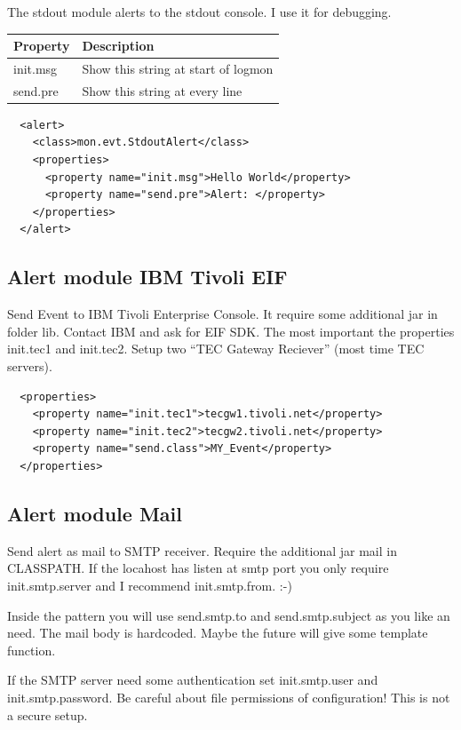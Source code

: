 \documentclass[11pt,a4paper]{article}
\begin{document}
The stdout module alerts to the stdout console. I use it for debugging.

\begin{tabular}{l|p{}}
  Property 	& Description\\\hline
  init.msg 	& Show this string at start of logmon\\
  send.pre 	& Show this string at every line\\
\end{tabular}

\begin{verbatim}
  <alert>
    <class>mon.evt.StdoutAlert</class>
    <properties>
      <property name="init.msg">Hello World</property>
      <property name="send.pre">Alert: </property>
    </properties>
  </alert>
\end{verbatim}

\subsection{Alert module IBM Tivoli EIF}
\label{sec:eif}

Send Event to IBM Tivoli Enterprise Console. It require some additional jar in
folder lib. Contact IBM and ask for EIF SDK. The most important the properties
init.tec1 and init.tec2. Setup two ``TEC Gateway Reciever'' (most time TEC
servers).

\begin{verbatim}
  <properties>
    <property name="init.tec1">tecgw1.tivoli.net</property>
    <property name="init.tec2">tecgw2.tivoli.net</property>
    <property name="send.class">MY_Event</property>
  </properties>
\end{verbatim}

\subsection{Alert module Mail}

Send alert as mail to SMTP receiver. Require the additional jar mail in
CLASSPATH. If the locahost has listen at smtp port you only require 
init.smtp.server and I recommend init.smtp.from. :-) 

Inside the pattern you will use send.smtp.to and send.smtp.subject as you like
an need. The mail body is hardcoded. Maybe the future will give
some template function. 

If the SMTP server need some authentication set init.smtp.user and
init.smtp.password. Be careful about file permissions of
configuration! This is not a secure setup.
\end{document}
